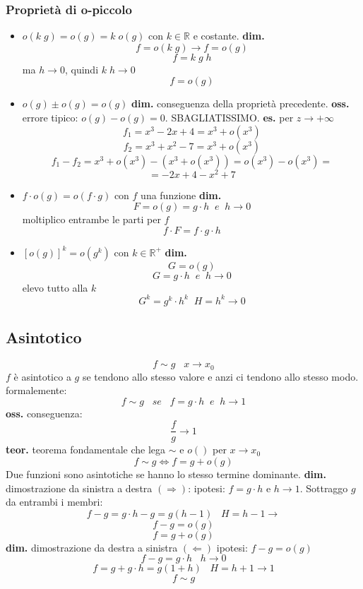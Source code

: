 \subsubsection*{Proprietà di o-piccolo}
\begin{itemize}
    \item $o(k \; g) = o(g) = k \; o(g)$ con $k \in \mathbb{R}$ e costante.
    \newline
    \textbf{dim.} 
    \[
        f = o( k \; g) \rightarrow f = o(g)
    \] 
    \[
        f= k \; g \; h
    \]
    ma $h\rightarrow0$, quindi $k \; h \rightarrow 0$
    \[
        f = o(g)
    \]
    \item $o(g) \pm o(g) = o(g)$
    \newline
    \textbf{dim.} conseguenza della proprietà precedente.
    \newline
    \textbf{oss.} errore tipico: $o(g) - o(g) = 0$. SBAGLIATISSIMO.
    \newline
    \textbf{es.} per $z\longrightarrow + \infty$
    \[
        f_1=x^3 -2x +4 = x^3 + o(x^3)
    \]
    \[
        f_2 = x^3 + x^2 -7 = x^3 + o(x^3)
    \]
    \[
        f_1 - f_2 = x^3 + o(x^3) -( x^3 + o(x^3)) = o(x^3) - o(x^3) =
    \]
    \[
        = -2x +4 - x^2 + 7 
    \]
    \item $f \cdot o(g) = o(f \cdot g)$  con $f$ una funzione
    \textbf{dim.} 
    \[
        F = o(g) = g \cdot h \;\; e \;\; h\rightarrow0
    \] 
    moltiplico entrambe le parti per $f$
    \[
        f \cdot F = f \cdot g \cdot h
    \]
    \item $[o(g)]^k = o(g^k)$ con $k \in \mathbb{R}^{+}$
    \textbf{dim.}
    \[
        G = o(g)
    \] 
    \[
        G = g \cdot h \;\; e \;\; h\rightarrow0
    \]
    elevo tutto alla $k$
    \[
        G^k = g^k \cdot h ^k \;\; H = h^k \rightarrow 0
    \]
\end{itemize}
\subsection*{Asintotico}
\[
    f \sim g \;\;\; x \rightarrow x_0
\]
$f$ è asintotico a $g$ se tendono allo stesso valore e anzi ci tendono allo stesso modo.
\newline
formalemente:
\[
    f \sim g \;\;\; se \;\;\; f=g \cdot  h \;\; e \;\; h\rightarrow 1
\]
\textbf{oss.} conseguenza:
\[
    \frac{f}{g} \rightarrow 1
\]
\textbf{teor.} teorema fondamentale che lega $ \sim $ e $o()$  
\newline
per $x\rightarrow x_0$
\[
    f \sim g \Longleftrightarrow f = g + o(g)
\]
Due funzioni sono asintotiche se hanno lo stesso termine dominante.
\newline
\textbf{dim.} dimostrazione da sinistra a destra $(\Rightarrow)$:
\newline
ipotesi: $ f= g \cdot  h$ e $ h \rightarrow 1$. Sottraggo $g$ da entrambi i membri:
\[
    f-g = g \cdot h -g = g(h-1) \;\;\; H = h-1  \longrightarrow
\]
\[
    f-g = o(g)
\]
\[
    f=g+o(g)
\]
\textbf{dim.} dimostrazione da destra a sinistra $(\Leftarrow)$
\newline
ipotesi: $f-g = o(g)$
\[
    f-g = g \cdot h \;\;\;h \rightarrow 0
\]
\[
    f = g + g \cdot h = g (1+h) \;\;\; H = h+1 \rightarrow 1
\]
\[
    f \sim g
\]
